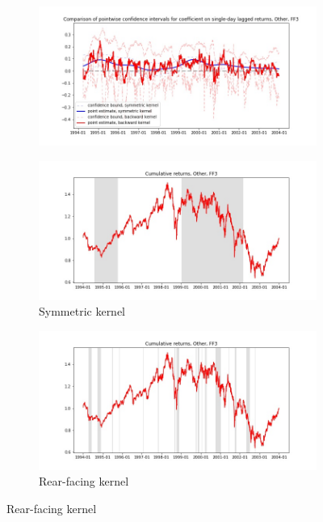 \documentclass{article}
\begin{document}
\newpage

\begin{figure}

\centering

  \begin{subfigure}[b]{\textwidth}
    \includegraphics[width=\textwidth]{Other/pointwiseCIs_layered_FF3.jpg}
    \label{fig:1}
  \end{subfigure}
  \begin{subfigure}[b]{0.45\textwidth}
    \includegraphics[width=\textwidth]{Other/full_cumrets_ofint_FF3.jpg}
    \caption*{Symmetric kernel}
    \label{fig:2}
  \end{subfigure}
   \begin{subfigure}[b]{0.45\textwidth}
    \includegraphics[width=\textwidth]{Other/bwunif_full_cumrets_ofint_FF3.jpg}
    \caption*{Rear-facing kernel}
    \label{fig:2}
  \end{subfigure}
  
\end{figure}
\end{document}

